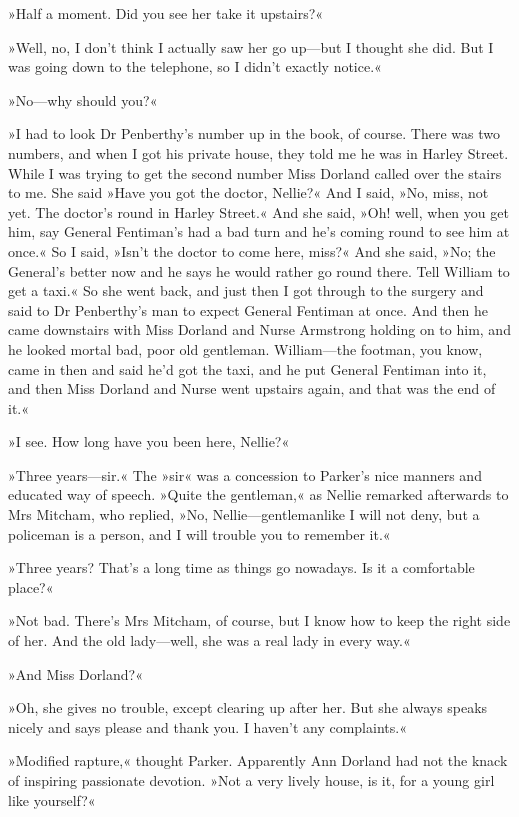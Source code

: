 »Half a moment. Did you see her take it upstairs?«

»Well, no, I don't think I actually saw her go up—but I thought she did. But I was going down to the telephone, so I didn't exactly notice.«

»No—why should you?«

»I had to look Dr Penberthy's number up in the book, of course. There was two numbers, and when I got his private house, they told me he was in Harley Street. While I was trying to get the second number Miss Dorland called over the stairs to me. She said »Have you got the doctor, Nellie?« And I said, »No, miss, not yet. The doctor's round in Harley Street.« And she said, »Oh! well, when you get him, say General Fentiman's had a bad turn and he's coming round to see him at once.« So I said, »Isn't the doctor to come here, miss?« And she said, »No; the General's better now and he says he would rather go round there. Tell William to get a taxi.« So she went back, and just then I got through to the surgery and said to Dr Penberthy's man to expect General Fentiman at once. And then he came downstairs with Miss Dorland and Nurse Armstrong holding on to him, and he looked mortal bad, poor old gentleman. William—the footman, you know, came in then and said he'd got the taxi, and he put General Fentiman into it, and then Miss Dorland and Nurse went upstairs again, and that was the end of it.«

»I see. How long have you been here, Nellie?«

»Three years—sir.« The »sir« was a concession to Parker's nice manners and educated way of speech. »Quite the gentleman,« as Nellie remarked afterwards to Mrs Mitcham, who replied, »No, Nellie—gentlemanlike I will not deny, but a policeman is a person, and I will trouble you to remember it.«

»Three years? That's a long time as things go nowadays. Is it a comfortable place?«

»Not bad. There's Mrs Mitcham, of course, but I know how to keep the right side of her. And the old lady—well, she was a real lady in every way.«

»And Miss Dorland?«

»Oh, she gives no trouble, except clearing up after her. But she always speaks nicely and says please and thank you. I haven't any complaints.«

»Modified rapture,« thought Parker. Apparently Ann Dorland had not the knack of inspiring passionate devotion. »Not a very lively house, is it, for a young girl like yourself?«

